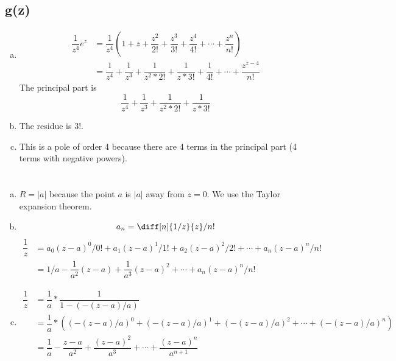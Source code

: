 \documentclass[12pt]{article}
\begin{document}
\subsection{g(z)}
\begin{enumerate}[(a)]
	\item 
	\begin{align*}
		\dfrac{1}{z^4}e^z &= \dfrac{1}{z^4} \left(1 + z + \dfrac{z^2}{2!} + \dfrac{z^3}{3!} + \dfrac{z^4}{4!} + \cdots + \dfrac{z^n}{n!}\right)\\
		&= \dfrac{1}{z^4} + \dfrac{1}{z^3} + \dfrac{1}{z^2 *  2!} + \dfrac{1}{z  * 3!} + \dfrac{1}{4!} +\cdots+ \dfrac{z^{z-4}}{n!}
	\end{align*}
	The principal part is \[ \dfrac{1}{z^4} + \dfrac{1}{z^3} + \dfrac{1}{z^2 *  2!} + \dfrac{1}{z  * 3!} \]
	
	\item The residue is $ 3! $.
	
	\item This is a pole of order 4 because there are 4 terms in the principal part (4 terms with negative powers).
\end{enumerate}
\newpage

\section{}
\begin{enumerate}[(a)]
	\item $ R = |a| $ because the point $ a $ is $ |a| $ away from $ z=0 $. We use the Taylor expansion theorem.
	
	\item \[ a_n = \diff[n]{1/z}{z} / n! \]
	\begin{align*}
		\dfrac{1}{z} &= a_0 (z-a)^0 / 0! + a_1 (z-a)^1 / 1! + a_2 (z-a)^2 / 2! + \cdots + a_n (z-a)^n / n! \\
		&= 1/a - \dfrac{1}{a^2} (z-a) + \dfrac{1}{a^3} (z-a)^2 + \cdots + a_n (z-a)^n / n!
	\end{align*}

	\item 
	\begin{align*}
		\dfrac{1}{z} &= \dfrac{1}{a} * \dfrac{1}{1- (-(z-a)/a)}\\
		&= \dfrac{1}{a} * \left((-(z-a)/a)^0 + (-(z-a)/a)^1 + (-(z-a)/a)^2 + \cdots + (-(z-a)/a)^n\right)\\
		&= \dfrac{1}{a} - \dfrac{z-a}{a^2} + \dfrac{(z-a)^2}{a^3} +\cdots+  \dfrac{(z-a)^n}{a^{n+1}}
	\end{align*}
\end{enumerate}
\newpage
\end{document}
